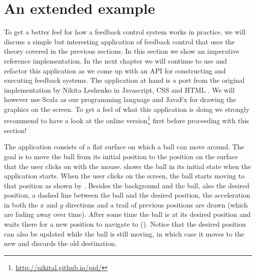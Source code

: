 \section{An extended example}
\label{sec:imperative-balltracker}
To get a better feel for how a feedback control system works in practice, we will discuss a simple but interesting application of feedback control that uses the theory covered in the previous sections. In this section we show an imperative reference implementation. In the next chapter we will continue to use and refactor this application as we come up with an API for constructing and executing feedback systems. The application at hand is a port from the original implementation by Nikita Leshenko in Javascript, CSS and HTML \cite{nikital-balltracker}. We will however use Scala as our programming language and JavaFx for drawing the graphics on the screen. To get a feel of what this application is doing we strongly recommend to have a look at the online version\footnote{\url{http://nikital.github.io/pid/}} first before proceeding with this section!

The application consists of a flat surface on which a ball can move around. The goal is to move the ball from its initial position to the position on the surface that the user clicks on with the mouse.  shows the ball in its initial state when the application starts. When the user clicks on the screen, the ball starts moving to that position as shown by . Besides the background and the ball, also the desired position, a dashed line between the ball and the desired position, the acceleration in both the $x$ and $y$ directions and a trail of previous positions are drawn (which are fading away over time). After some time the ball is at its desired position and waits there for a new position to navigate to (). Notice that the desired position can also be updated while the ball is still moving, in which case it moves to the new and discards the old destination.


